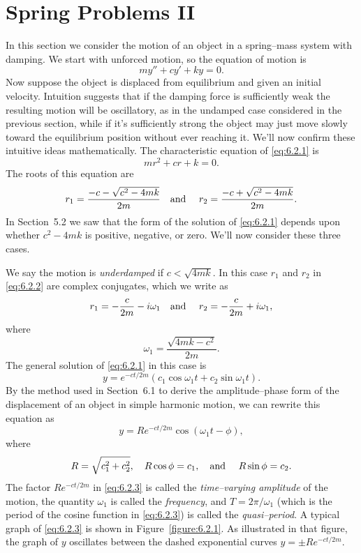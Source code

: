 \section{Spring Problems II}


\noindent
In this section we consider the motion of an object in a spring--mass system with damping. We start
with unforced motion, so the equation of motion is
\begin{equation}
  \label{eq:6.2.1}my''+cy'+ky=0.
\end{equation}
Now suppose the object is displaced from equilibrium and given an initial velocity. Intuition
suggests that if the damping force is sufficiently weak the resulting motion will be oscillatory, as
in the undamped case considered in the previous section, while if it's sufficiently strong the
object may just move slowly toward the equilibrium position without ever reaching it. We'll now
confirm these intuitive ideas mathematically. The characteristic equation of \eqref{eq:6.2.1} is
\[
  mr^{2}+cr+k=0.
\]
The roots of this equation are
\begin{equation}
  \label{eq:6.2.2}r_{1}=\frac{-c-\sqrt{c^{2}-4mk}}{2m}\mbox{\quad and \quad}r_{2}= \frac{-c+\sqrt{c^{2}-4mk}}{2m}.
\end{equation}
In Section~5.2 we saw that the form of the solution of \eqref{eq:6.2.1} depends upon whether
$c^{2}-4mk$ is positive, negative, or zero. We'll now consider these three cases.


\noindent
We say the motion is {\color{blue}\it underdamped\/} if $c<\sqrt{4mk}$. In this case $r_{1}$ and
$r_{2}$ in \eqref{eq:6.2.2} are complex conjugates, which we write as
\[
  r_{1}=-\frac{c}{2m}-i\omega_{1}\mbox{\quad and \quad}r_{2}=-\frac{c}{2m}+i\omega_{1},
\]
where
\[
  \omega_{1}=\frac{\sqrt{4mk-c^{2}}}{2m}.
\]
The general solution of \eqref{eq:6.2.1} in this case is
\[
  y=e^{-ct/2m}(c_{1}\cos\omega_{1}t+c_{2}\sin\omega_{1}t).
\]
By the method used in Section~6.1 to derive the amplitude--phase form of the displacement of an
object in simple harmonic motion, we can rewrite this equation as
\begin{equation}
  \label{eq:6.2.3}y=Re^{-ct/2m}\cos(\omega_{1}t-\phi),
\end{equation}
where
\[
  R=\sqrt{c_{1}^{2}+c_{2}^{2}},\quad R\cos\phi=c_{1},\mbox{\quad and \quad}R\sin\phi=c_{2}.
\]
The factor $Re^{-ct/2m}$ in \eqref{eq:6.2.3} is called the {\color{blue}\it time--varying
amplitude\/} of the motion, the quantity $\omega_{1}$ is called the {\color{blue}\it frequency\/},
and $T=2\pi/\omega_{1}$ (which is the period of the cosine function in \eqref{eq:6.2.3}) is called
the {\color{blue}\it quasi--period\/}. A typical graph of \eqref{eq:6.2.3} is shown in
Figure~\ref{figure:6.2.1}. As illustrated in that figure, the graph of $y$ oscillates between the
dashed exponential curves $y=\pm Re^{-ct/2m}$.

